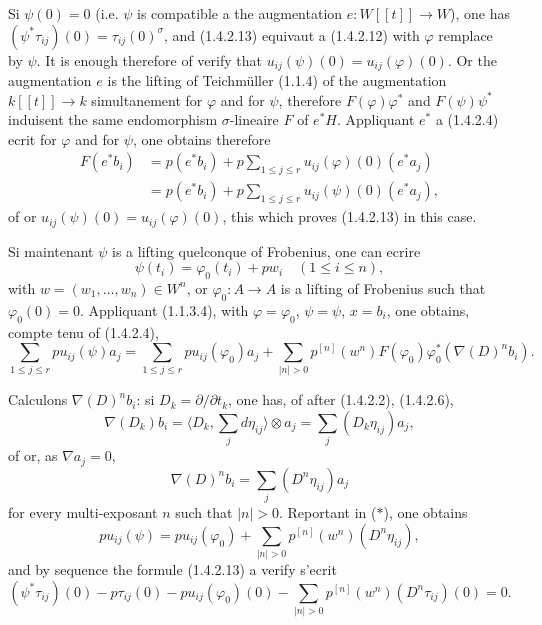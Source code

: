 \documentclass[12pt,a4paper]{article}
\theoremstyle{plain}
\theoremstyle{definition}
\theoremstyle{remark}
\begin{document}
Si $\psi(0) = 0$ (i.e. $\psi$ is compatible a the augmentation $e : W[[t]] \to W$), one has $(\psi^*\tau_{ij})(0) = \tau_{ij}(0)^\sigma$, and (1.4.2.13) equivaut a (1.4.2.12) with $\varphi$ remplace by $\psi$. It is enough therefore of verify that $u_{ij}(\psi)(0) = u_{ij}(\varphi)(0)$. Or the augmentation $e$ is the lifting of Teichm\"uller (1.1.4) of the augmentation $k[[t]] \to k$ simultanement for $\varphi$ and for $\psi$, therefore $F(\varphi)\varphi^*$ and $F(\psi)\psi^*$ induisent the same endomorphism $\sigma$-lineaire $F$ of $e^*H$. Appliquant $e^*$ a (1.4.2.4) ecrit for $\varphi$ and for $\psi$, one obtains therefore
\begin{align*}
F(e^*b_i) &= p(e^*b_i) + p\sum_{1\leqslant j\leqslant r} u_{ij}(\varphi)(0)(e^*a_j) \\
&= p(e^*b_i) + p\sum_{1\leqslant j\leqslant r} u_{ij}(\psi)(0)(e^*a_j),
\end{align*}
of or $u_{ij}(\psi)(0) = u_{ij}(\varphi)(0)$, this which proves (1.4.2.13) in this case.

Si maintenant $\psi$ is a lifting quelconque of Frobenius, one can ecrire
\[
\psi(t_i) = \varphi_0(t_i) + pw_i \quad (1 \leqslant i \leqslant n),
\]
with $w = (w_1, \ldots, w_n) \in W^n$, or $\varphi_0 : A \to A$ is a lifting of Frobenius such that $\varphi_0(0) = 0$. Appliquant (1.1.3.4), with $\varphi = \varphi_0$, $\psi = \psi$, $x = b_i$, one obtains, compte tenu of (1.4.2.4),
\begin{equation*}
\sum_{1\leqslant j\leqslant r} p u_{ij}(\psi)a_j = \sum_{1\leqslant j\leqslant r} p u_{ij}(\varphi_0)a_j + \sum_{|n|>0} p^{[n]}(w^n)F(\varphi_0)\varphi_0^*(\nabla(D)^n b_i). \tag{$\ast$}
\end{equation*}

Calculons $\nabla(D)^n b_i$: si $D_k = \partial/\partial t_k$, one has, of after (1.4.2.2), (1.4.2.6),
\[
\nabla(D_k)b_i = \langle D_k, \sum_j d\eta_{ij} \rangle \otimes a_j = \sum_j (D_k \eta_{ij})a_j,
\]
of or, as $\nabla a_j = 0$,
\[
\nabla(D)^n b_i = \sum_j (D^n \eta_{ij})a_j
\]
for every multi-exposant $n$ such that $|n| > 0$. Reportant in ($\ast$), one obtains
\[
pu_{ij}(\psi) = pu_{ij}(\varphi_0) + \sum_{|n|>0} p^{[n]}(w^n)(D^n \eta_{ij}),
\]
and by sequence the formule (1.4.2.13) a verify s'ecrit
\begin{equation*}
(\psi^*\tau_{ij})(0) - p\tau_{ij}(0) - pu_{ij}(\varphi_0)(0) - \sum_{|n|>0} p^{[n]}(w^n)(D^n \tau_{ij})(0) = 0. \tag{$\ast\ast$}
\end{equation*}
\end{document}
